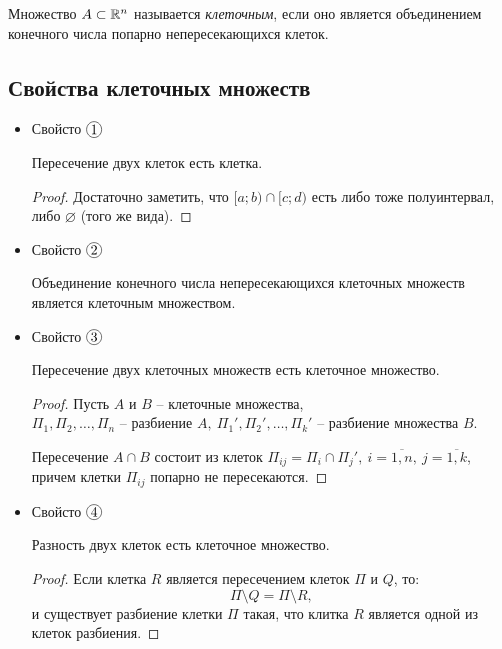 \begin{definition}
    Множество $A \subset \mathbb{R}^n$ называется \emph{клеточным}, если оно является объединением конечного числа попарно непересекающихся клеток.
\end{definition}

\newpage

\subsection{Свойства клеточных множеств}

\begin{itemize}
    \item Свойсто $ \circled{1} $
          \begin{statement}
              Пересечение двух клеток есть клетка.
          \end{statement}
          \begin{proof}
              Достаточно заметить, что $[a;b) \cap [c;d)$ есть либо тоже полуинтервал, либо $\varnothing$ (того же вида).
          \end{proof}

    \item Свойсто $ \circled{2} $
          \begin{statement}
              Объединение конечного числа непересекающихся клеточных множеств является клеточным множеством.
          \end{statement}

    \item Свойсто $ \circled{3} $
          \begin{statement}
              Пересечение двух клеточных множеств есть клеточное множество.
          \end{statement}
          \begin{proof}
              Пусть $A$ и $B$ -- клеточные множества, \\ $\Pi_1,\Pi_2,\ldots,\Pi_n$ -- разбиение $A, \ \Pi_1',\Pi_2',\ldots,\Pi_k'$ -- разбиение множества $B$.

              Пересечение $A \cap B$ состоит из клеток $\Pi_{ij} = \Pi_i \cap \Pi_j', \ i = \overline{1,n}, \ j = \overline{1,k}$, причем клетки $\Pi_{ij}$ попарно не пересекаются.
          \end{proof}

    \item Свойсто $ \circled{4} $
          \begin{statement}
              Разность двух клеток есть клеточное множество.
          \end{statement}
          \begin{proof}
              Если клетка $R$ является пересечением клеток $\Pi$ и $Q$, то:
              \[
                  \Pi \setminus Q = \Pi \setminus R,
              \]
              и существует разбиение клетки $\Pi$ такая, что клитка $R$ является одной из клеток разбиения.
          \end{proof}


\end{itemize}
